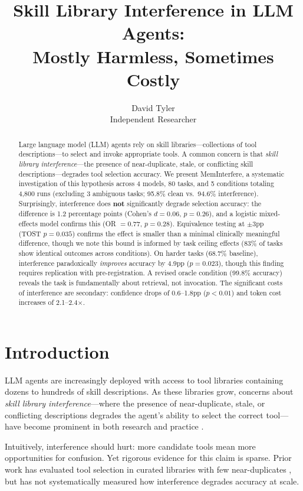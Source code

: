 \documentclass[11pt]{article}
\title{Skill Library Interference in LLM Agents: \\ Mostly Harmless, Sometimes Costly}
\author{
  David Tyler \\
  Independent Researcher
}
\date{}
\begin{document}
\maketitle

\begin{abstract}
Large language model (LLM) agents rely on skill libraries---collections of tool descriptions---to select and invoke appropriate tools. A common concern is that \textit{skill library interference}---the presence of near-duplicate, stale, or conflicting skill descriptions---degrades tool selection accuracy. We present MemInterfere, a systematic investigation of this hypothesis across 4 models, 80 tasks, and 5 conditions totaling 4,800 runs (excluding 3 ambiguous tasks; 95.8\% clean vs.\ 94.6\% interference). Surprisingly, interference does \textbf{not} significantly degrade selection accuracy: the difference is 1.2 percentage points (Cohen's $d = 0.06$, $p = 0.26$), and a logistic mixed-effects model confirms this (OR $= 0.77$, $p = 0.28$). Equivalence testing at $\pm$3pp (TOST $p = 0.035$) confirms the effect is smaller than a minimal clinically meaningful difference, though we note this bound is informed by task ceiling effects (83\% of tasks show identical outcomes across conditions). On harder tasks (68.7\% baseline), interference paradoxically \emph{improves} accuracy by 4.9pp ($p = 0.023$), though this finding requires replication with pre-registration. A revised oracle condition (99.8\% accuracy) reveals the task is fundamentally about retrieval, not invocation. The significant costs of interference are secondary: confidence drops of 0.6--1.8pp ($p < 0.01$) and token cost increases of 2.1--2.4$\times$.
\end{abstract}

\section{Introduction}

LLM agents are increasingly deployed with access to tool libraries containing dozens to hundreds of skill descriptions. As these libraries grow, concerns about \textit{skill library interference}---where the presence of near-duplicate, stale, or conflicting descriptions degrades the agent's ability to select the correct tool---have become prominent in both research and practice \citep{schick2023toolformer, patil2023gorilla, qin2023toolllm}.

Intuitively, interference should hurt: more candidate tools mean more opportunities for confusion. Yet rigorous evidence for this claim is sparse. Prior work has evaluated tool selection in curated libraries with few near-duplicates \citep{li2023api}, but has not systematically measured how interference degrades accuracy at scale.
\end{document}
